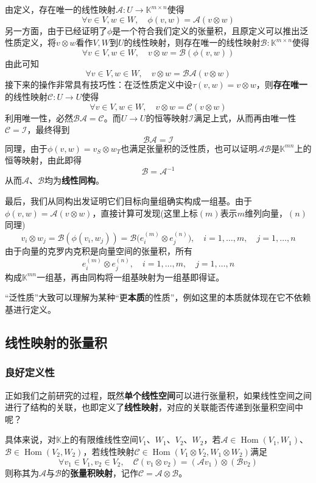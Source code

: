 \documentclass[a4paper,UTF8,fontset=windows,AutoFakeBold]{ctexart}
\DeclareMathOperator{\Hom}{Hom}
\newcommand*{\ma}{\mathcal{A}}
\newcommand*{\mb}{\mathcal{B}}
\newcommand*{\mc}{\mathcal{C}}
\newcommand*{\mi}{\mathcal{I}}
\newcommand*{\note}{\noindent *}
\begin{document}
{\begin{itemize}
        由定义，存在唯一的线性映射$\ma:U\to\mathbb{K}^{m\times n}$使得
        $$\forall v\in V,w\in W,\quad\phi(v,w)=\ma(v\otimes w)$$
        另一方面，由于已经证明了$\phi$是一个符合我们定义的张量积，且原定义可以推出泛性质定义，将$v\otimes w$看作$V,W$到$U$的线性映射，则存在唯一的线性映射$\mb:\mathbb{K}^{m\times n}$使得
        $$\forall v\in V,w\in W,\quad v\otimes w=\mb(\phi(v,w))$$
        由此可知
        $$\forall v\in V,w\in W,\quad v\otimes w=\mb\ma(v\otimes w)$$
        接下来的操作非常具有技巧性：在泛性质定义中设$\tau(v,w)=v\otimes w$，则\textbf{存在唯一}的线性映射$\mc:U\to U$使得
        $$\forall v\in V,w\in W,\quad v\otimes w=\mc(v\otimes w)$$
        利用唯一性，必然$\mb\ma=\mc$。而$U\to U$的恒等映射$\mi$满足上式，从而再由唯一性$\mc=\mi$，最终得到
        $$\mb\ma=\mi$$
        同理，由于$\phi(v,w)=v_S\otimes w_T$也满足张量积的泛性质，也可以证明$\ma\mb$是$\mathbb{K}^{mn}$上的恒等映射，由此即得
        $$\mb=\ma^{-1}$$
        从而$\ma$、$\mb$均为\textbf{线性同构}。

        最后，我们从同构出发证明它们目标向量组确实构成一组基。由于$\phi(v,w)=\ma(v\otimes w)$，直接计算可发现(这里上标$(m)$表示$m$维列向量，$(n)$同理)
        $$v_i\otimes w_j=\mb(\phi(v_i,w_j))=\mb\big(e_i^{(m)}\otimes e_j^{(n)}\big),\quad i=1,\dots,m,\quad j=1,\dots,n$$
        由于向量的克罗内克积是向量空间的张量积，所有
        $$e_i^{(m)}\otimes e_j^{(n)},\quad i=1,\dots,m,\quad j=1,\dots,n$$
        构成$\mathbb{K}^{mn}$一组基，再由同构将一组基映射为一组基即得证。
    \end{itemize}
}

\note ``泛性质''大致可以理解为某种``更\textbf{本质}的性质''，例如这里的本质就体现在它不依赖基进行定义。

\subsection{线性映射的张量积}
\subsubsection{良好定义性}
正如我们之前研究的过程，既然\textbf{单个线性空间}可以进行张量积，如果线性空间之间进行了结构的关联，也即定义了\textbf{线性映射}，对应的关联能否传递到张量积空间中呢？

具体来说，对$\mathbb{K}$上的有限维线性空间$V_1$、$W_1$、$V_2$、$W_2$，若$\ma\in\Hom(V_1,W_1)$、$\mb\in\Hom(V_2,W_2)$，若线性映射$\mc\in\Hom(V_1\otimes V_2,W_1\otimes W_2)$满足
$$\forall v_1\in V_1,v_2\in V_2,\quad\mc(v_1\otimes v_2)=(\ma v_1)\otimes(\mb v_2)$$
则称其为$\ma$与$\mb$的\textbf{张量积映射}，记作$\mc=\ma\otimes\mb$。
\end{document}
